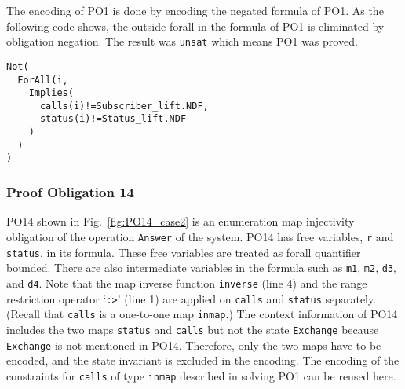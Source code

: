 The encoding of PO1 is done by encoding the negated formula of PO1. As the following code shows, the outside forall in the formula of PO1 is eliminated by obligation negation. The result was {\tt unsat} which means PO1 was proved.



\begin{mdframed}[roundcorner=5pt,shadow=true]
\begin{Verbatim}[fontsize=\small]
Not(
  ForAll(i,
    Implies(
      calls(i)!=Subscriber_lift.NDF,
      status(i)!=Status_lift.NDF
    )
  )
)
\end{Verbatim}
\end{mdframed}


\subsubsection{Proof Obligation 14}

PO14 shown in Fig.~\ref{fig:PO14_case2} is an enumeration map injectivity obligation of the operation {\tt Answer} of the system. PO14 has free variables, {\tt r} and {\tt status}, in its formula. These free variables are treated as forall quantifier bounded. There are also intermediate variables in the formula such as {\tt m1}, {\tt m2}, {\tt d3}, and {\tt d4}. Note that the map inverse function {\tt inverse} (line 4) and the range restriction operator `{\tt :>}' (line 1) are applied on {\tt calls} and {\tt status} separately. (Recall that {\tt calls} is a one-to-one map {\tt inmap}.) The context information of PO14 includes the two maps {\tt status} and {\tt calls} but not the state {\tt Exchange} because {\tt Exchange} is not mentioned in PO14. Therefore, only the two maps have to be encoded, and the state invariant is excluded in the encoding. The encoding of the constraints for {\tt calls} of type {\tt inmap} described in solving PO1 can be reused here.

